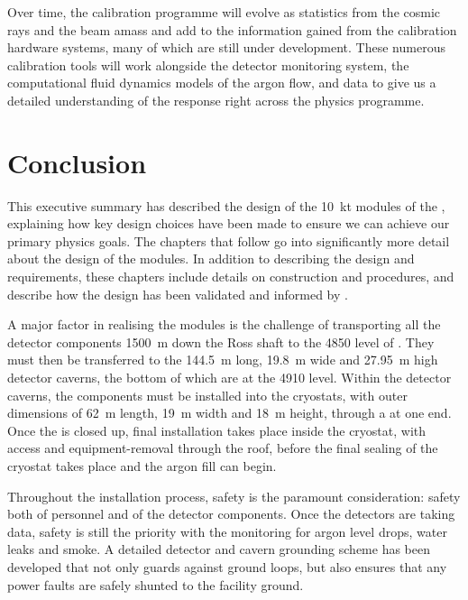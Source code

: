 Over time, the  calibration programme will evolve as statistics from the cosmic rays and the  beam amass and add to the information gained from the calibration hardware systems, many of which are still under development. These numerous calibration tools will work alongside the detector monitoring system, the computational fluid dynamics models of the argon flow, and  data to give us a detailed understanding of the  response right across the  physics programme.


\section{Conclusion}
\label{sec:fdsp-exec-conclusion}

This executive summary has described the design of the \SI{10}{\kilo\tonne}   modules of the  , explaining how key design choices have been made to ensure we can achieve our primary physics goals. The chapters that follow go into significantly more detail about the design of the   modules. In addition to describing the design and requirements, these chapters include details on construction and  procedures, and describe how the design has been validated and informed by .

A major factor in realising the   modules is the challenge of transporting all the detector components \SI{1500}{\meter} down the Ross shaft to the \SI{4850}{\foot} level of . They must then be transferred to the \SI{144.5}{\meter} long, \SI{19.8}{\meter} wide and \SI{27.95}{\meter} high detector caverns, the bottom of which are at the \SI{4910}{\foot} level. Within the detector caverns, the components must be installed into the cryostats, with outer dimensions of \SI{62}{\meter} length, \SI{19}{\meter} width and \SI{18}{\meter} height, through a  at one end. Once the  is closed up, final installation takes place inside the cryostat, with access and equipment-removal through the roof, before the final sealing of the cryostat takes place and the argon fill can begin.

Throughout the installation process, safety is the paramount consideration: safety both of personnel and of the detector components. Once the detectors are taking data, safety is still the priority with the  monitoring for argon level drops, water leaks and smoke. A detailed detector and cavern grounding scheme has been developed that not only guards against ground loops, but also ensures that any power faults are safely shunted to the facility ground.

